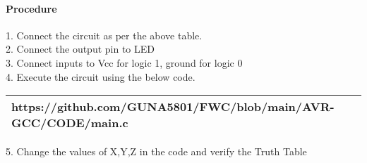 \documentclass[journal,12pt,two column]{IEEEtran}
\begin{document}
    \paragraph{Procedure}
    
    1. Connect the circuit as per the above table.\\
    2. Connect the output pin to LED\\
    3. Connect inputs to Vcc for logic 1, ground for logic 0\\
    4. Execute the circuit using the below code.\\
   
\begin{tabularx}{0.46\textwidth} { 
  | >{\centering\arraybackslash}X |}
  \hline
  https://github.com/GUNA5801/FWC/blob/main/AVR-GCC/CODE/main.c\\
  \hline
\end{tabularx}
   
5. Change the values of X,Y,Z in the code and verify the Truth Table\\

\end{document}
